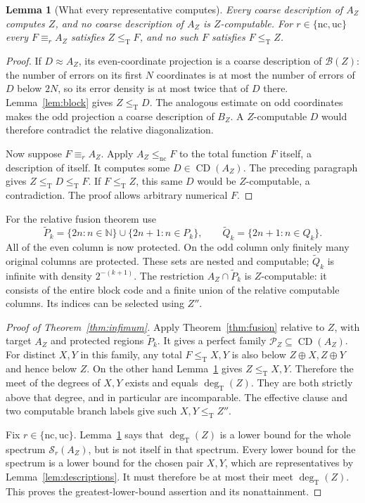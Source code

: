 \documentclass[11pt,a4paper]{article}
\newcommand{\N}{\mathbb N}
\newcommand{\leT}{\leq_{\mathrm T}}
\newcommand{\degT}{\operatorname{deg}_{\mathrm T}}
\newcommand{\CD}{\operatorname{CD}}
\newcommand{\nc}{\mathrm{nc}}
\newcommand{\uc}{\mathrm{uc}}
\newcommand{\Spec}{\mathcal S}
\newcommand{\Block}{\mathcal B}
\newtheorem{lemma}[theorem]{Lemma}
\theoremstyle{definition}
\theoremstyle{remark}
\begin{document}
\begin{lemma}[What every representative computes]\label{lem:anchor}
Every coarse description of $A_Z$ computes $Z$, and no coarse description
of $A_Z$ is $Z$-computable. For $r\in\{\nc,\uc\}$ every
$F\equiv_r A_Z$ satisfies $Z\leT F$, and no such $F$ satisfies $F\leT Z$.
\end{lemma}
\begin{proof}
If $D\approx A_Z$, its even-coordinate projection is a coarse description
of $\Block(Z)$: the number of errors on its first $N$ coordinates is at
most the number of errors of $D$ below $2N$, so its error density is at
most twice that of $D$ there. Lemma~\ref{lem:block} gives $Z\leT D$.
The analogous estimate on odd coordinates makes the odd projection a
coarse description of $B_Z$. A $Z$-computable $D$ would therefore contradict
the relative diagonalization.

Now suppose $F\equiv_r A_Z$. Apply $A_Z\le_{\nc}F$ to the total function
$F$ itself, a description of itself. It computes some $D\in\CD(A_Z)$.
The preceding paragraph gives $Z\leT D\leT F$. If $F\leT Z$, this same
$D$ would be $Z$-computable, a contradiction. The proof allows arbitrary
numerical $F$.
\end{proof}

For the relative fusion theorem use
\begin{equation}\label{eq:anchoredprotect}
 \widetilde P_k=\{2n:n\in\N\}\cup\{2n+1:n\in P_k\},
 \qquad
 \widetilde Q_k=\{2n+1:n\in Q_k\}.
\end{equation}
All of the even column is now protected. On the odd column only finitely
many original columns are protected. These sets are nested and computable;
$\widetilde Q_k$ is infinite with density $2^{-(k+1)}$.
The restriction $A_Z\cap\widetilde P_k$ is $Z$-computable: it consists of
the entire block code and a finite union of the relative computable columns.
Its indices can be selected using $Z''$.

\begin{proof}[Proof of Theorem~\ref{thm:infimum}]
Apply Theorem~\ref{thm:fusion} relative to $Z$, with target $A_Z$ and
protected regions $\widetilde P_k$. It gives a perfect family
$\mathcal P_Z\subseteq\CD(A_Z)$. For distinct $X,Y$ in this family,
any total $F\leT X,Y$ is also below $Z\oplus X,Z\oplus Y$ and hence
below $Z$. On the other hand Lemma~\ref{lem:anchor} gives $Z\leT X,Y$.
Therefore the meet of the degrees of $X,Y$ exists and equals $\degT(Z)$.
They are both strictly above that degree, and in particular are incomparable.
The effective clause and two computable branch labels give such $X,Y\leT Z''$.

Fix $r\in\{\nc,\uc\}$. Lemma~\ref{lem:anchor} says that $\degT(Z)$
is a lower bound for the whole spectrum $\Spec_r(A_Z)$, but is not itself
in that spectrum. Every lower bound for the spectrum is a lower bound
for the chosen pair $X,Y$, which are representatives by
Lemma~\ref{lem:descriptions}. It must therefore be at most their meet
$\degT(Z)$. This proves the greatest-lower-bound assertion and its
nonattainment.
\end{proof}
\end{document}
